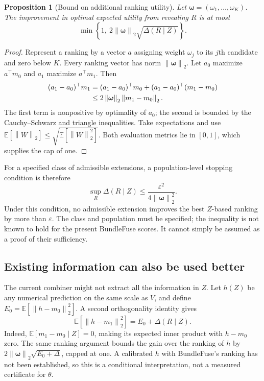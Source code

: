 \documentclass[11pt,a4paper]{article}
\newtheorem{proposition}{Proposition}
\newcommand{\E}{\mathbb E}
\newcommand{\norm}[1]{\left\lVert #1\right\rVert}
\begin{document}
\begin{proposition}[Bound on additional ranking utility]
Let $\boldsymbol\omega=(\omega_1,\ldots,\omega_K)$. The improvement in
optimal expected utility from revealing $R$ is at most
\begin{equation}
 \min\left\{1,\ 2\norm{\boldsymbol\omega}_2
                    \sqrt{\Delta(R\mid Z)}\right\}.
 \label{eq:gainbound}
\end{equation}
\end{proposition}
\begin{proof}
Represent a ranking by a vector $a$ assigning weight $\omega_j$ to its
$j$th candidate and zero below $K$. Every ranking vector has norm
$\norm{\boldsymbol\omega}_2$. Let $a_0$ maximize $a^\top m_0$ and
$a_1$ maximize $a^\top m_1$. Then
\begin{align}
 (a_1-a_0)^\top m_1
 &= (a_1-a_0)^\top m_0+(a_1-a_0)^\top(m_1-m_0)\notag\\
 &\leq 2\norm{\boldsymbol\omega}_2\norm{m_1-m_0}_2.
\end{align}
The first term is nonpositive by optimality of $a_0$; the second is bounded
by the Cauchy--Schwarz and triangle inequalities. Take expectations and
use $\E[\norm{W}_2]\leq\sqrt{\E[\norm{W}_2^2]}$. Both evaluation
metrics lie in $[0,1]$, which supplies the cap of one.
\end{proof}

For a specified class of admissible extensions, a population-level stopping
condition is therefore
\begin{equation}
 \sup_R\Delta(R\mid Z)\leq
 \frac{\varepsilon^2}{4\norm{\boldsymbol\omega}_2^2}.
 \label{eq:populationstop}
\end{equation}
Under this condition, no admissible extension improves the best $Z$-based
ranking by more than $\varepsilon$. The class and population must be
specified; the inequality is not known to hold for the present BundleFuse
scores. It cannot simply be assumed as a proof of their sufficiency.

\subsection{Existing information can also be used better}

The current combiner might not extract all the information in $Z$. Let
$h(Z)$ be any numerical prediction on the same scale as $V$, and define
$E_0=\E[\norm{h-m_0}_2^2]$. A second orthogonality identity gives
\begin{equation}
 \E[\norm{h-m_1}_2^2]=E_0+\Delta(R\mid Z).
 \label{eq:extraction}
\end{equation}
Indeed, $\E[m_1-m_0\mid Z]=0$, making its expected inner product with
$h-m_0$ zero. The same ranking argument bounds the gain over the ranking
of $h$ by $2\norm{\boldsymbol\omega}_2\sqrt{E_0+\Delta}$, capped at one.
A calibrated $h$ with BundleFuse's ranking has not been established, so this
is a conditional interpretation, not a measured certificate for $\theta$.
\end{document}
